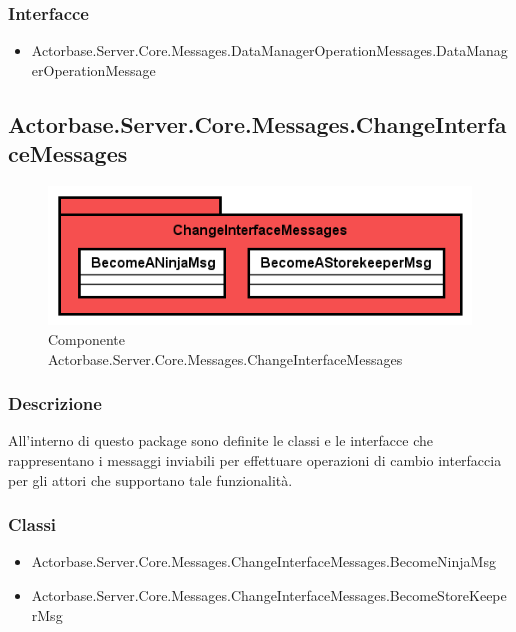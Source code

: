 \documentclass[a4paper]{article}
\begin{document}
			\subsubsection{Interfacce}
			\begin{itemize}
				\item Actorbase.Server.Core.Messages.DataManagerOperationMessages.DataManagerOperationMessage
			\end{itemize}
			
			\subsection{Actorbase.Server.Core.Messages.ChangeInterfaceMessages}
			\begin{figure} [H]
			\centering
			\includegraphics[scale=0.65]{Server/Package/ChangeInterfaceMessagesLevel.png}
			\caption{Componente Actorbase.Server.Core.Messages.ChangeInterfaceMessages}
			\end{figure}
			\subsubsection{Descrizione}
				All'interno di questo package sono definite le classi e le interfacce che rappresentano i messaggi inviabili per effettuare operazioni di cambio interfaccia per gli attori che supportano tale funzionalità.
			\subsubsection{Classi}
			\begin{itemize}
				\item Actorbase.Server.Core.Messages.ChangeInterfaceMessages.BecomeNinjaMsg
				\item Actorbase.Server.Core.Messages.ChangeInterfaceMessages.BecomeStoreKeeperMsg
			\end{itemize}
			
			
\end{document}
